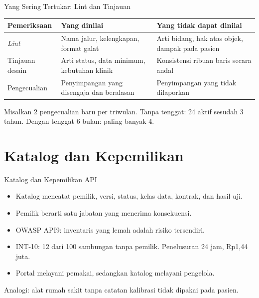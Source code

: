 \documentclass[aspectratio=169, table, 12pt]{beamer}
\begin{document}
\begin{frame}{{\Large Yang Sering Tertukar: Lint dan Tinjauan}}
  \footnotesize
  \begin{tabularx}{\textwidth}{>{\raggedright\arraybackslash}p{2.6cm} >{\raggedright\arraybackslash}X >{\raggedright\arraybackslash}X}
    \hline
    \textbf{Pemeriksaan} & \textbf{Yang dinilai} & \textbf{Yang tidak dapat dinilai} \\ \hline
    \textit{Lint} & Nama jalur, kelengkapan, format galat & Arti bidang, hak atas objek, dampak pada pasien \\ \hline
    Tinjauan desain & Arti status, data minimum, kebutuhan klinik & Konsistensi ribuan baris secara andal \\ \hline
    Pengecualian & Penyimpangan yang disengaja dan beralasan & Penyimpangan yang tidak dilaporkan \\ \hline
  \end{tabularx}

  \vspace{8pt}
  \small Misalkan 2 pengecualian baru per triwulan. Tanpa tenggat: 24 aktif sesudah 3 tahun. Dengan tenggat 6 bulan: paling banyak 4.
\end{frame}

\section{Katalog dan Kepemilikan}

\begin{frame}{{\Large Katalog dan Kepemilikan API}}
  \vspace{8pt}
  \begin{itemize}
    \item Katalog mencatat pemilik, versi, status, kelas data, kontrak, dan hasil uji.
    \item Pemilik berarti satu jabatan yang menerima konsekuensi.
    \item OWASP API9: inventaris yang lemah adalah risiko tersendiri.
    \item INT-10: 12 dari 100 sambungan tanpa pemilik. Penelusuran 24 jam, Rp1,44 juta.
    \item Portal melayani pemakai, sedangkan katalog melayani pengelola.
  \end{itemize}
  \vspace{4pt}
  {\small Analogi: alat rumah sakit tanpa catatan kalibrasi tidak dipakai pada pasien.}
\end{frame}
\end{document}
